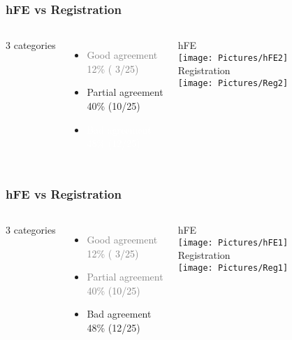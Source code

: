 \documentclass[xcolor=table,11pt]{beamer}
\begin{document}
	\begin{frame}[noframenumbering]
		\frametitle{hFE vs Registration}
		\centering
		\vspace{2mm}
		\begin{columns}
			\vfill
			3 categories\\
			\vfill
			\begin{itemize}
				\item \textcolor{gray}{Good agreement\\12\% ( 3/25)}
				\item Partial agreement\\40\% (10/25)
				\item \textcolor{white}{Bad agreement\\48\% (12/25)}
			\end{itemize}
			\vfill

			\centering
			hFE\\
			\texttt{[image: Pictures/hFE2]}\vspace{5mm}\\
			Registration\\
			\texttt{[image: Pictures/Reg2]}
		\end{columns}
	\end{frame}

	\begin{frame}[noframenumbering]
		\frametitle{hFE vs Registration}
		\centering
		\vspace{2mm}
		\begin{columns}
			\column{0.33\linewidth}
			\vfill
			3 categories\\
			\vfill
			\begin{itemize}
				\item \textcolor{gray}{Good agreement\\12\% ( 3/25)}
				\item \textcolor{gray}{Partial agreement\\40\% (10/25)}
				\item Bad agreement\\48\% (12/25)
			\end{itemize}
			\vfill

			\column{0.4\linewidth}
			\centering
			hFE\\
			\texttt{[image: Pictures/hFE1]}\vspace{5mm}\\
			Registration\\
			\texttt{[image: Pictures/Reg1]}
		\end{columns}
	\end{frame}
\end{document}
